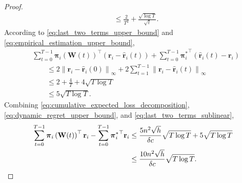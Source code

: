 \documentclass[10pt]{article}
\def\rvr{{\mathbf{r}}}
\def\rvpi{{\boldsymbol{\pi}}}
\def\rmW{{\mathbf{W}}}
\begin{document}
\begin{proof}
\begin{equation}
\begin{split}
    &\le \frac{2}{T^2} + \frac{\sqrt{\log{T}}}{\sqrt{t}}.
\end{split}
\end{equation}
According to \cref{eq:last_two_terms_upper_bound} and \cref{eq:empirical_estimation_upper_bound},
\begin{equation}
\label{eq:last_two_terms_sublinear}
\begin{split}
    &\sum\limits_{t=0}^{T-1}{ \rvpi_i\left(\rmW(t)\right)^\top \left( \rvr_i - \hat{\rvr}_i(t) \right) } + \sum\limits_{t=0}^{T-1}{ {\rvpi_i^*}^\top \left( \hat{\rvr}_i(t) - \rvr_i \right) } \\
    &\qquad \le 2 \left\| \rvr_i - \hat{\rvr}_i(0) \right\|_\infty + 2 \sum\limits_{t=1}^{T-1}{ \left\| \rvr_i - \hat{\rvr}_i(t) \right\|_\infty } \\
    &\qquad \le 2 + \frac{4}{T} + 4 \sqrt{T \log{T}} \\
    &\qquad \le 5 \sqrt{T \log{T}}.
\end{split}
\end{equation}
Combining \cref{eq:cumulative_expected_loss_decomposition}, \cref{eq:dynamic_regret_upper_bound}, and \cref{eq:last_two_terms_sublinear},
\begin{equation*}
\begin{split}
    \sum\limits_{t=0}^{T-1}{\rvpi_i\left(\rmW(t)\right)^\top \rvr_i} - \sum\limits_{t=0}^{T-1}{ {\rvpi_i^*}^\top \rvr_i } &\le \frac{5 n^2 \sqrt{h}}{\delta c}\sqrt{T \log{T}} + 5 \sqrt{T \log{T}} \\
    &\le \frac{10 n^2 \sqrt{h}}{\delta c}\sqrt{T \log{T}}. \qedhere
\end{split}
\end{equation*}
\end{proof}
\end{document}
